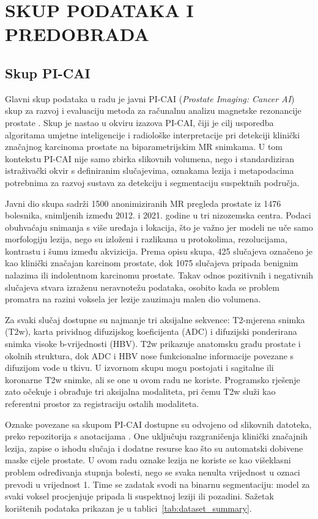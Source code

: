 \documentclass[a4paper,12pt,oneside]{article}
\let\sectionwithoutpagebreak\section
\renewcommand{\section}{\clearpage\sectionwithoutpagebreak}%
\begin{document}
\section{SKUP PODATAKA I PREDOBRADA}

\subsection{Skup PI-CAI}

Glavni skup podataka u radu je javni PI-CAI (\textit{Prostate Imaging: Cancer AI}) skup za razvoj i evaluaciju metoda za računalnu analizu magnetske rezonancije prostate \cite{picai_dataset}. Skup je nastao u okviru izazova PI-CAI, čiji je cilj usporedba algoritama umjetne inteligencije i radiološke interpretacije pri detekciji klinički značajnog karcinoma prostate na biparametrijskim MR snimkama. U tom kontekstu PI-CAI nije samo zbirka slikovnih volumena, nego i standardiziran istraživački okvir s definiranim slučajevima, oznakama lezija i metapodacima potrebnima za razvoj sustava za detekciju i segmentaciju suspektnih područja.

Javni dio skupa sadrži 1500 anonimiziranih MR pregleda prostate iz 1476 bolesnika, snimljenih između 2012. i 2021. godine u tri nizozemska centra. Podaci obuhvaćaju snimanja s više uređaja i lokacija, što je važno jer modeli ne uče samo morfologiju lezija, nego su izloženi i razlikama u protokolima, rezolucijama, kontrastu i šumu između akvizicija. Prema opisu skupa, 425 slučajeva označeno je kao klinički značajan karcinom prostate, dok 1075 slučajeva pripada benignim nalazima ili indolentnom karcinomu prostate. Takav odnos pozitivnih i negativnih slučajeva stvara izraženu neravnotežu podataka, osobito kada se problem promatra na razini voksela jer lezije zauzimaju malen dio volumena.

Za svaki slučaj dostupne su najmanje tri aksijalne sekvence: T2-mjerena snimka (T2w), karta prividnog difuzijskog koeficijenta (ADC) i difuzijski ponderirana snimka visoke b-vrijednosti (HBV). T2w prikazuje anatomsku građu prostate i okolnih struktura, dok ADC i HBV nose funkcionalne informacije povezane s difuzijom vode u tkivu. U izvornom skupu mogu postojati i sagitalne ili koronarne T2w snimke, ali se one u ovom radu ne koriste. Programsko rješenje zato očekuje i obrađuje tri aksijalna modaliteta, pri čemu T2w služi kao referentni prostor za registraciju ostalih modaliteta.

Oznake povezane sa skupom PI-CAI dostupne su odvojeno od slikovnih datoteka, preko repozitorija s anotacijama \cite{picai_labels}. One uključuju razgraničenja klinički značajnih lezija, zapise o ishodu slučaja i dodatne resurse kao što su automatski dobivene maske cijele prostate. U ovom radu oznake lezija ne koriste se kao višeklasni problem određivanja stupnja bolesti, nego se svaka nenulta vrijednost u oznaci prevodi u vrijednost 1. Time se zadatak svodi na binarnu segmentaciju: model za svaki voksel procjenjuje pripada li suspektnoj leziji ili pozadini. Sažetak korištenih podataka prikazan je u tablici~\ref{tab:dataset_summary}.
\end{document}
